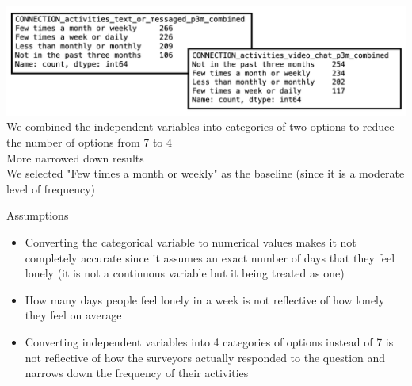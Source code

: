 \documentclass{beamer}
\begin{document}
\begin{frame}
\includegraphics[width=\linewidth]{Screenshot 2024-12-01 at 12.16.24 PM.png}
We combined the independent variables into categories of two options to reduce the number of options from 7 to 4\\
More narrowed down results\\
\vspace{1em}
\small We selected "Few times a month or weekly" as the baseline (since it is a moderate level of frequency)
\end{frame}

\begin{frame}{Assumptions}
\begin{itemize}
    \item Converting the categorical variable to numerical values makes it not completely accurate since it assumes an exact number of days that they feel lonely (it is not a continuous variable but it being treated as one)\\
    \item How many days people feel lonely in a week is not reflective of how lonely they feel on average\\
    \item Converting independent variables into 4 categories of options instead of 7 is not reflective of how the surveyors actually responded to the question and narrows down the frequency of their activities
\end{itemize}
\end{frame}
\end{document}
